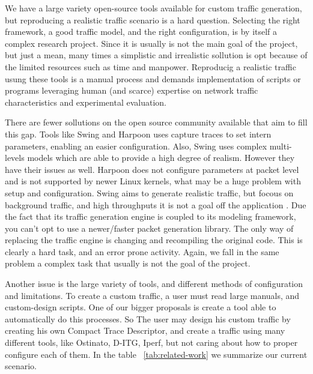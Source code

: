 We have a large variety open-source tools available for custom traffic generation, but reproducing a realistic traffic scenario is a hard question. Selecting the right framework, a good traffic model, and the right configuration, is by itself a complex research project\cite{legotg-paper}\cite{selfsimilar-ethernet}. Since it is usually is not the main goal of the project, but just a mean, many times a simplistic and irrealistic sollution is opt because of the limited resources such as time and manpower.  Reproducig a realistic traffic usung these tools is a manual process and demands implementation of scripts or programs leveraging human (and scarce) expertise on network traffic characteristics  and experimental evaluation. 


There are fewer sollutions on the open source community available that aim to fill this gap. Tools like Swing and Harpoon uses capture traces to set intern parameters, enabling an easier configuration. Also, Swing uses complex multi-levels models which are able to provide a high degree of realism\cite{swing-paper}. However they have their issues as well. Harpoon does not configure parameters at packet level\cite{harpoon-paper} and is not supported by newer Linux kernels, what may be a huge problem with setup and configuration. Swing\cite{swing-paper} aims to generate realistic traffic, but focous on background traffic, and high throughputs it is not a goal off the application\cite{swing-paper} \cite{legotg-paper}. Due the fact that its traffic generation engine is coupled to its modeling framework, you can't opt to use a newer/faster packet generation library. The only way of replacing the traffic engine is changing and recompiling the original code. This is clearly a hard task\cite{legotg-paper}, and an error prone activity. Again, we fall in the same problem a complex task that usually is not the goal of the project. 

Another issue is the large variety of tools, and different methods of configuration and limitations. To create a custom traffic, a user must read large manuals, and custom-design scripts. One of our bigger proposals is create a tool able to automatically do this processes. So The user may design his custom traffic by creating his own Compact Trace Descriptor, and create a traffic using many different tools, like Ostinato, D-ITG, Iperf, but not caring about how to proper configure each of them. In the table ~\ref{tab:related-work} we summarize our current scenario.



